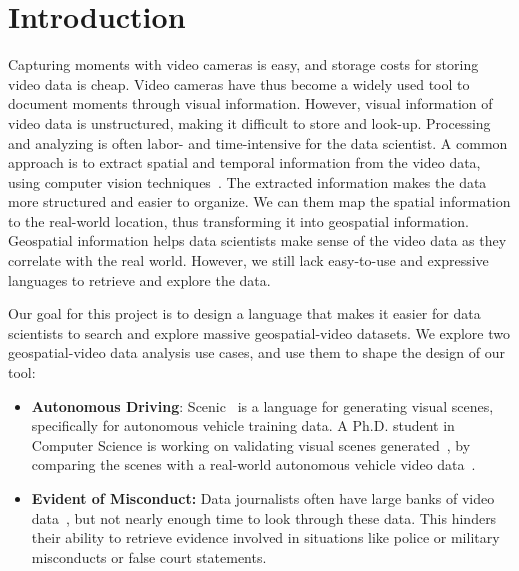 
\section{Introduction}

Capturing moments with video cameras is easy, and storage costs for storing video data is cheap. Video cameras have thus become a widely used tool to document moments through visual information.
However, visual information of video data is unstructured, making it difficult to store and look-up.
Processing and analyzing is often labor- and time-intensive for the data scientist. 
A common approach is to extract spatial and temporal information from the video data, using computer vision techniques~\cite{redmon:yolo,wojke:deepsort}.
The extracted information makes the data more structured and easier to organize.
We can them map the spatial information to the real-world location, thus transforming it into geospatial information.
Geospatial information helps data scientists make sense of the video data as they correlate with the real world.
However, we still lack easy-to-use and expressive languages to retrieve and explore the data.

Our goal for this project is to design a language that makes it easier for data scientists to search and explore massive geospatial-video datasets. We explore two geospatial-video data analysis use cases, and use them to shape the design of our tool:

\begin{itemize}
    \item
    \textbf{Autonomous Driving}: Scenic~\cite{fremont:scenic} is a language for generating visual scenes, specifically for autonomous vehicle training data.
    A Ph.D. student in Computer Science is working on validating visual scenes generated~\cite{kim:scenic-validation},
    by comparing the scenes with a real-world autonomous vehicle video data~\cite{ceasar:nuscenes}.
    
    \item
    \textbf{Evident of Misconduct:}
    Data journalists often have large banks of video data~\cite{mcdowell:myanmar}, but not nearly enough time to look through these data. This hinders their ability to retrieve evidence involved in situations like police or military misconducts or false court statements.
\end{itemize}

